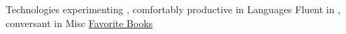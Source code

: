 

\begin{cvskills}
  \cvskill
    {Technologies} 
    {experimenting , comfortably productive in }
  \cvskill
    {Languages}
    {Fluent in , conversant in }
  \cvskill
    {Misc}
    {\href{https://eugenelerman.net/recommended-reading/}{\faBook\acvHeaderIconSep Favorite Books}}
\end{cvskills}
